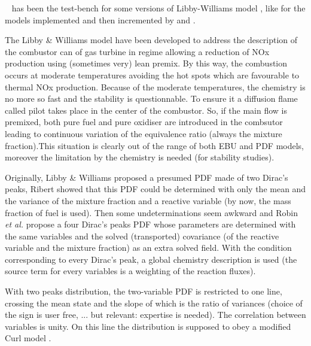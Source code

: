 \CS~ has been the test-bench for some versions of Libby-Williams model \cite{Libby:2000a},
like for the models implemented and then incremented by \cite{Ribert:2004a} and \cite{Robin:2005a}.

The Libby \& Williams model have been developed to address the description of
the combustor can of gas turbine in regime allowing a reduction of NOx
production using (sometimes very) lean premix. By this way, the combustion
occurs at moderate temperatures avoiding the hot spots which are favourable to
thermal NOx production. Because of the moderate temperatures, the chemistry is
no more so fast and the stability is questionnable. To ensure it a diffusion
flame called pilot takes place in the center of the combustor. So, if the main
flow is premixed, both pure fuel and pure oxidiser are introduced in the
combsutor leading to continuous variation of the equivalence ratio (always the
mixture fraction).This situation is clearly out of the range of both EBU and PDF
models, moreover the limitation by the chemistry is needed (for stability studies).

Originally, Libby \& Williams proposed a presumed PDF made of two Dirac's peaks,
Ribert showed that this PDF could be determined with only the mean and the
variance of the mixture fraction and a reactive variable (by now, the mass
fraction of fuel is used). Then some undeterminations seem awkward and Robin
\emph{et al.} propose a four Dirac's peaks PDF whose parameters are determined with the
same variables and the solved ({\small transported}) covariance (of the reactive
variable and the mixture fraction) as an extra solved field. With the condition
corresponding to every Dirac's peak, a global chemistry description is used (the
source term for every variables is a weighting of the reaction fluxes).

With two peaks distribution, the two-variable PDF is restricted to one line,
crossing the mean state and the slope of which is the ratio of
variances (choice of the sign is user free, ... but relevant: expertise is needed). The correlation between variables is unity.
On this line the distribution is supposed to obey a modified Curl model \cite{Curl:1963a}.

